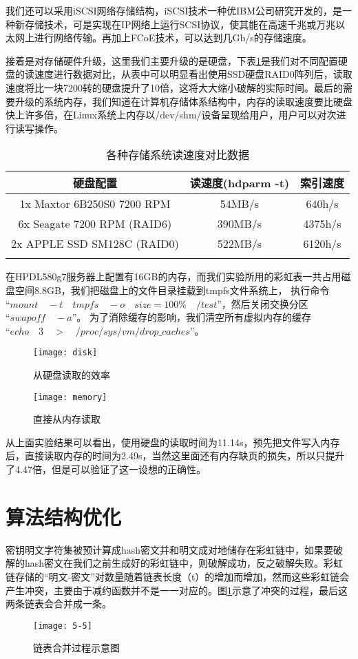 我们还可以采用iSCSI网络存储结构，iSCSI技术一种优IBM公司研究开发的，是一种新存储技术，可是实现在IP网络上运行SCSI协议，使其能在高速千兆或万兆以太网上进行网络传输。再加上FCoE技术，可以达到几Gb/s的存储速度。

接着是对存储硬件升级，这里我们主要升级的是硬盘，下表\ref{tab:5.1}是我们对不同配置硬盘的读速度进行数据对比，从表中可以明显看出使用SSD硬盘RAID0阵列后，读取速度将比一块7200转的硬盘提升了10倍，这将大大缩小破解的实际时间。最后的需要升级的系统内存，我们知道在计算机存储体系结构中，内存的读取速度要比硬盘快上许多倍，在Linux系统上内存以/dev/shm/设备呈现给用户，用户可以对次进行读写操作。
\begin{longtable}{@{\extracolsep{\fill}}ccc}
\caption{各种存储系统读速度对比数据}\\\toprule[1pt]
\multicolumn{1}{c}{硬盘配置} &
\multicolumn{1}{c}{读速度(hdparm -t)} &
\multicolumn{1}{c}{索引速度} \\\midrule
1x Maxtor 6B250S0 7200 RPM & 54MB/s & 640h/s \\
6x Seagate 7200 RPM (RAID6) & 390MB/s & 4375h/s \\
2x APPLE SSD SM128C (RAID0) & 522MB/s & 6120h/s \\
\bottomrule[1pt]
\label{tab:5.1}
\end{longtable}
在HP\quad DL580g7服务器上配置有16GB的内存，而我们实验所用的彩虹表一共占用磁盘空间8.8GB，我们把磁盘上的文件目录挂载到tmpfs文件系统上，
执行命令$“mount\quad -t\quad tmpfs\quad -o\quad size=100\%\quad /test”$，然后关闭交换分区$“swapoff\quad -a”$。
为了消除缓存的影响，我们清空所有虚拟内存的缓存$“echo\quad 3\quad >\quad /proc/sys/vm/drop\_caches”$。
\begin{figure}[!ht]
\centering
\texttt{[image: disk]}
\caption{从硬盘读取的效率}
\end{figure}
\begin{figure}[!ht]
\centering
\texttt{[image: memory]}
\caption{直接从内存读取}
\end{figure}

从上面实验结果可以看出，使用硬盘的读取时间为11.14s，预先把文件写入内存后，直接读取内存的时间为2.49s，当然这里面还有内存缺页的损失，所以只提升了4.47倍，但是可以验证了这一设想的正确性。
\section{算法结构优化}
密钥明文字符集被预计算成hash密文并和明文成对地储存在彩虹链中，如果要破解的hash密文在我们之前生成好的彩虹链中，则破解成功，反之破解失败。彩虹链存储的“明文-密文”对数量随着链表长度（t）的增加而增加，然而这些彩虹链会产生冲突，主要由于减约函数并不是一一对应的。图\ref{fig:5.5}示意了冲突的过程，最后这两条链表会合并成一条。
\begin{figure}[!ht]
\centering
\texttt{[image: 5-5]}
\caption{链表合并过程示意图}
\label{fig:5.5}
\end{figure}

